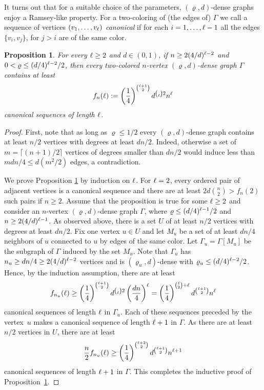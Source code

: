 \documentclass[reqno, 12pt]{amsart}
\let\polishlcross=\l
\def\l{\ifmmode\ell\else\polishlcross\fi}
\newtheorem{prop}[theorem]{Proposition}
\let\rho=\varrho
\begin{document}
It turns out that for a suitable choice of the parameters, $(\rho,d)$-dense graphs enjoy a
Ramsey-like property. For a two-coloring of (the edges of) $\Gamma$ we call a sequence of vertices
$(v_1,\dots,v_\l)$ \emph{canonical} if for each $i=1,\dots,\l-1$ all the edges $\{v_i,v_j\}$, for
$j>i$ are of the same color.


\begin{prop}\label{rhodee} For every $\l\ge 2$ and $d\in(0,1)$, if $n\ge 2(4/d)^{\l-2}$ and $0<\rho\le (d/4)^{\l-2}/2$, then  every two-colored $n$-vertex
$(\rho,d)$-dense graph $\Gamma$ contains at least
\[
    f_n(\l):=\left(\frac14\right)^{\binom{\l+1}2}d^{\binom \l2} n^\l
\]
canonical sequences of length $\l$.
\end{prop}

\begin{proof}
First, note that as long as $\rho\le 1/2$ every $(\rho,d)$-dense graph contains at least $n/2$
vertices with degrees at least $dn/2$. Indeed, otherwise a set of $m=\lceil (n+1)/2\rceil$ vertices
of degrees smaller than $dn/2$ would induce less than $mdn/4\le d(m^2/2)$ edges, a contradiction.

We prove Proposition \ref{rhodee} by induction on $\l$. For $\l=2$, every ordered pair of adjacent vertices is a canonical sequence and there are at least $2d\binom n2>f_n(2)$ such pairs if $n\ge2$. Assume that
the proposition is true for some $\l\ge2$ and consider an $n$-vertex $(\rho,d)$-dense graph $\Gamma$, where $\rho\le (d/4)^{\l-1}/2$ and $n\ge 2(4/d)^{\l-1}$. As observed above, there is a set $U$ of at least $n/2$ vertices with degrees at least $dn/2$. Fix one vertex $u\in U$ and let $M_u$ be a set of at least $dn/4$ neighbors of $u$ connected to $u$ by edges of the same color. Let $\Gamma_u=\Gamma[M_u]$ be the subgraph of $\Gamma$ induced  by the set $M_u$. Note that $\Gamma_u$ has $n_u\ge dn/4\ge 2(4/d)^{\l-2}$ vertices and  is $(\rho_u,d)$-dense with $\rho_u\le (d/4)^{\l-2}/2$. Hence, by the induction assumption, there are at least
$$
f_{n_u}(\l)
\ge
\left(\frac14\right)^{\binom{\l+1}2}d^{\binom \l2} \left(\frac{dn}{4}\right)^\l
=
\left(\frac14\right)^{\binom{\l}2+\l}d^{\binom {\l+1}2}n^\l
$$
canonical sequences of length $\l$ in $\Gamma_u$. Each of these sequences preceded by the vertex~$u$ makes a canonical sequence of length $\l+1$ in $\Gamma$. As there are at least $n/2$ vertices in $U$, there are at least
$$
\frac n2f_{n_u}(\l)
\ge
\left(\frac14\right)^{\binom{\l+2}2}d^{\binom {\l+1}2}n^{\l+1}$$
canonical sequences of length $\l+1$ in $\Gamma$. This completes the inductive proof of Proposition~\ref{rhodee}. 
\end{proof}
\end{document}
